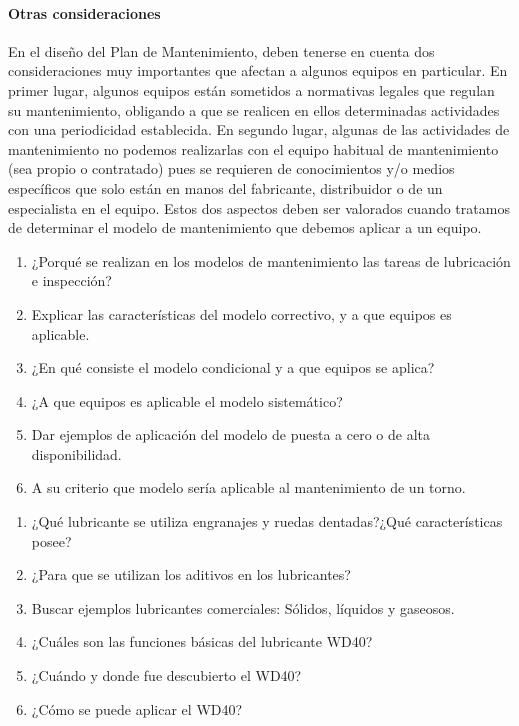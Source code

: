\documentclass[../main]{subfiles}
\begin{document}
\paragraph{ Otras consideraciones}
En el diseño del Plan de Mantenimiento, deben tenerse en cuenta dos consideraciones muy importantes que afectan a algunos equipos en particular. En
primer lugar, algunos equipos están sometidos a normativas legales que regulan su mantenimiento, obligando a que se realicen en ellos determinadas
actividades con una periodicidad establecida.
En segundo lugar, algunas de las actividades de mantenimiento no podemos realizarlas con el equipo habitual de mantenimiento (sea propio o
contratado) pues se requieren de conocimientos y/o medios específicos que
solo están en manos del fabricante, distribuidor o de un especialista en el
equipo.
Estos dos aspectos deben ser valorados cuando tratamos de determinar el
modelo de mantenimiento que debemos aplicar a un equipo.

\begin{enumerate}
    \item ¿Porqué se realizan en los modelos de mantenimiento las tareas de lubricación e inspección?
    \item Explicar las características del modelo correctivo, y a que equipos es aplicable.
    \item ¿En qué consiste el modelo condicional y a que equipos se aplica?
    \item ¿A que equipos es aplicable el modelo sistemático?
    \item Dar ejemplos de aplicación del modelo de puesta a cero o de alta disponibilidad.
    \item A su criterio que modelo sería aplicable al mantenimiento de un torno.
\end{enumerate}

\begin{enumerate}
    \item ¿Qué lubricante se utiliza engranajes y ruedas dentadas?¿Qué características posee?
    \item ¿Para que se utilizan los aditivos en los lubricantes?
    \item Buscar ejemplos lubricantes comerciales: Sólidos, líquidos y gaseosos.


\item ¿Cuáles son las funciones básicas del lubricante WD40?

\item ¿Cuándo y donde fue descubierto el WD40?

\item ¿Cómo se puede aplicar el WD40?

\end{enumerate}
\end{document}
